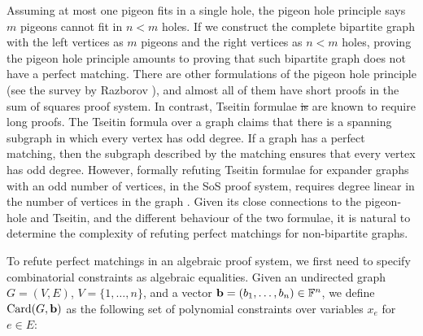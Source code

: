 \documentclass[11pt]{article}
\providecommand{\DIFadd}[1]{\textcolor{shin-ryoku}{#1}}%
\providecommand{\DIFdel}[1]{\textcolor{verylightgray}{\sout{#1}}}                      %
\providecommand{\DIFaddbegin}{} %
\providecommand{\DIFaddend}{} %
\providecommand{\DIFdelbegin}{} %
\providecommand{\DIFdelend}{} %
\begin{document}
Assuming at most one pigeon fits in a single hole, the pigeon hole principle says $m$ pigeons cannot fit in $n < m$ holes.
If we construct the complete bipartite graph with the left vertices as $m$ pigeons and the right vertices as $n < m$ holes, proving the pigeon hole principle amounts to proving that such bipartite graph does not have a perfect matching.
There are other formulations of the pigeon hole principle (see the survey by Razborov \citep{razbarov2002pgp}), and almost all of them have short proofs in the sum of squares proof system.
In contrast, Tseitin formulae \DIFdelbegin \DIFdel{is }\DIFdelend \DIFaddbegin \DIFadd{are }\DIFaddend known to require long proofs. The Tseitin formula over a graph claims that there is a spanning subgraph in which every vertex has odd degree.
If a graph has a perfect matching, then the subgraph described by the matching ensures that every vertex has odd degree.
However, formally refuting Tseitin formulae for expander graphs with \DIFaddbegin \DIFadd{an }\DIFaddend odd number of vertices, in the SoS proof system, requires degree linear in the number of vertices in the graph \cite{grigoriev2001linear}.
Given its close connections to the pigeon-hole and Tseitin, and the different behaviour of the two formulae, it is natural to determine the complexity of refuting perfect matchings for non-bipartite graphs.

To refute perfect matchings in an algebraic proof system, we first need to specify combinatorial constraints as algebraic equalities. Given an undirected graph $G=(V,E)$, $V = \{1, \ldots, n\}$, and a vector $\mathbf{b} = (b_1, \ldots, b_{n}) \in \mathbb{F}^{n}$,
we define $\text{Card}(G, \mathbf{b})$ as the following set of polynomial constraints over variables $x_e$ for $e \in E$:
\end{document}
